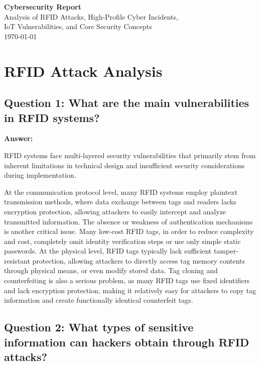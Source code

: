 \documentclass[12pt,a4paper]{article}
\begin{document}
\begin{titlepage}
\centering
\vspace*{2cm}
{\Huge\bfseries Cybersecurity Report}\\[2cm]
{\Large Analysis of RFID Attacks, High-Profile Cyber Incidents,\\
IoT Vulnerabilities, and Core Security Concepts}\\[3cm]
\vfill
{\large \today}
\end{titlepage}

\newpage
\tableofcontents
\newpage

\section{RFID Attack Analysis}

\subsection{Question 1: What are the main vulnerabilities in RFID systems?}

\textbf{Answer:}

RFID systems face multi-layered security vulnerabilities that primarily stem from inherent limitations in technical design and insufficient security considerations during implementation.

At the communication protocol level, many RFID systems employ plaintext transmission methods, where data exchange between tags and readers lacks encryption protection, allowing attackers to easily intercept and analyze transmitted information. The absence or weakness of authentication mechanisms is another critical issue. Many low-cost RFID tags, in order to reduce complexity and cost, completely omit identity verification steps or use only simple static passwords. At the physical level, RFID tags typically lack sufficient tamper-resistant protection, allowing attackers to directly access tag memory contents through physical means, or even modify stored data. Tag cloning and counterfeiting is also a serious problem, as many RFID tags use fixed identifiers and lack encryption protection, making it relatively easy for attackers to copy tag information and create functionally identical counterfeit tags.

\subsection{Question 2: What types of sensitive information can hackers obtain through RFID attacks?}
\end{document}
